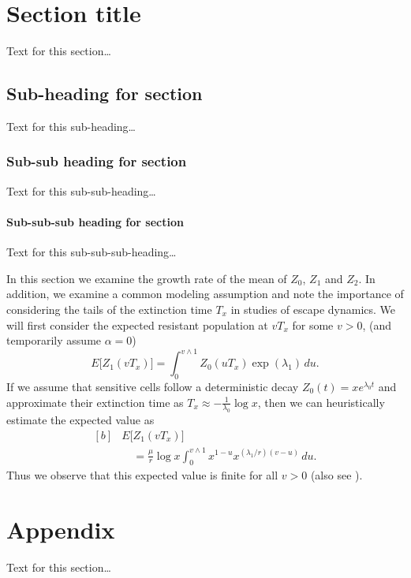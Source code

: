 \documentclass{bmcart}
\begin{document}
\section*{Section title}
Text for this section\ldots
\subsection*{Sub-heading for section}
Text for this sub-heading\ldots
\subsubsection*{Sub-sub heading for section}
Text for this sub-sub-heading\ldots
\paragraph*{Sub-sub-sub heading for section}
Text for this sub-sub-sub-heading\ldots

In this section we examine the growth rate of the mean of $Z_0$, $Z_1$ and $Z_2$. In
addition, we examine a common modeling assumption and note the
importance of considering the tails of the extinction time $T_x$ in
studies of escape dynamics.
We will first consider the expected resistant population at $vT_x$ for
some $v>0$, (and temporarily assume $\alpha=0$)
%
\[
E \bigl[Z_1(vT_x) \bigr]=
\int_0^{v\wedge
1}Z_0(uT_x)
\exp (\lambda_1)\,du .
\]
%
If we assume that sensitive cells follow a deterministic decay
$Z_0(t)=xe^{\lambda_0 t}$ and approximate their extinction time as
$T_x\approx-\frac{1}{\lambda_0}\log x$, then we can heuristically
estimate the expected value as
%
\begin{equation}\label{eqexpmuts}
\begin{aligned}[b]
&      E\bigl[Z_1(vT_x)\bigr]\\
&\quad      = \frac{\mu}{r}\log x
\int_0^{v\wedge1}x^{1-u}x^{({\lambda_1}/{r})(v-u)}\,du .
\end{aligned}
\end{equation}
%
Thus we observe that this expected value is finite for all $v>0$ (also see \cite{koon,xjon,marg,schn,koha,issnic}).


\section*{Appendix}
Text for this section\ldots

\end{document}
